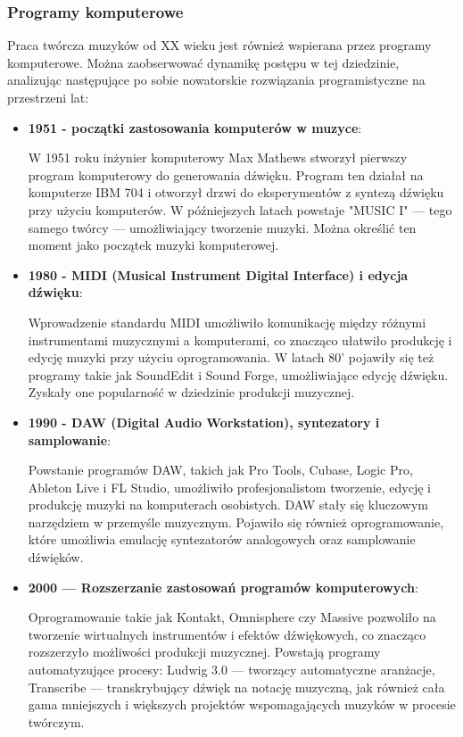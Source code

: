 \documentclass[12pt]{article}
\begin{document}
\subsubsection{Programy komputerowe}
Praca twórcza muzyków od XX wieku jest również wspierana przez programy komputerowe. Można zaobserwować dynamikę postępu
w tej dziedzinie, analizując następujące po sobie nowatorskie rozwiązania programistyczne na przestrzeni lat:
\begin{itemize}
	\item \textbf{1951 - początki zastosowania komputerów w muzyce}:
	      
	      W 1951 roku inżynier komputerowy Max Mathews stworzył pierwszy program komputerowy do generowania dźwięku.
	      Program ten działał na komputerze IBM 704 i otworzył drzwi do eksperymentów z syntezą dźwięku przy użyciu komputerów.
	      W późniejszych latach powstaje "MUSIC I" — tego samego twórcy — umożliwiający tworzenie muzyki.
	      Można określić ten moment jako początek muzyki komputerowej.
	\item \textbf{1980 - MIDI (Musical Instrument Digital Interface) i edycja dźwięku}:
	      
	      Wprowadzenie standardu MIDI umożliwiło komunikację między różnymi instrumentami muzycznymi a komputerami,
	      co znacząco ułatwiło produkcję i edycję muzyki przy użyciu oprogramowania.
	      W latach 80' pojawiły się też programy takie jak SoundEdit i Sound Forge, umożliwiające edycję dźwięku.
	      Zyskały one popularność w dziedzinie produkcji muzycznej.
	\item \textbf{1990 - DAW (Digital Audio Workstation), syntezatory i samplowanie}:
	      
	      Powstanie programów DAW, takich jak Pro Tools, Cubase, Logic Pro, Ableton Live i FL Studio,
	      umożliwiło profesjonalistom tworzenie, edycję i produkcję muzyki na komputerach osobistych.
	      DAW stały się kluczowym narzędziem w przemyśle muzycznym.
	      Pojawiło się również oprogramowanie, które umożliwia emulację syntezatorów analogowych oraz samplowanie dźwięków.
	\item \textbf{2000 — Rozszerzanie zastosowań programów komputerowych}:
	      
	      Oprogramowanie takie jak Kontakt, Omnisphere czy Massive pozwoliło na tworzenie wirtualnych instrumentów i efektów
	      dźwiękowych, co znacząco rozszerzyło możliwości produkcji muzycznej.
	      Powstają programy automatyzujące procesy: Ludwig 3.0 — tworzący automatyczne aranżacje, Transcribe — transkrybujący
	      dźwięk na notację muzyczną, jak również cała gama mniejszych i większych projektów wspomagających muzyków w procesie
	      twórczym.
\end{itemize}
\end{document}
